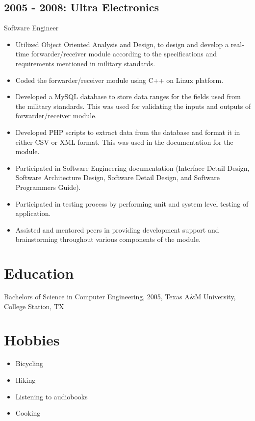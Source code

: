 \documentclass[11pt]{article}
\begin{document}
        \subsection*{2005 - 2008: Ultra Electronics} 
            Software Engineer
            \begin{itemize}
                \item Utilized Object Oriented Analysis and Design, to design and develop a real-time forwarder/receiver module according to the specifications and requirements mentioned in military standards.
                \item Coded the forwarder/receiver module using C++ on Linux platform.
                \item Developed a MySQL database to store data ranges for the fields used from the military standards. This was used for validating the inputs and outputs of forwarder/receiver module.
                \item Developed PHP scripts to extract data from the database and format it in either CSV or XML format. This was used in the documentation for the module.
                \item Participated in Software Engineering documentation (Interface Detail Design, Software Architecture Design, Software Detail Design, and Software Programmers Guide).
                \item Participated in testing process by performing unit and system level testing of application.
                \item Assisted and mentored peers in providing development support and brainstorming throughout various components of the module.
            \end{itemize}

    \section*{Education}

        Bachelors of Science in Computer Engineering, 2005, Texas A\&M University, College Station, TX

    \section*{Hobbies}
        \begin{itemize}
            \item Bicycling
            \item Hiking
            \item Listening to audiobooks
            \item Cooking
        \end{itemize}
\end{document}
